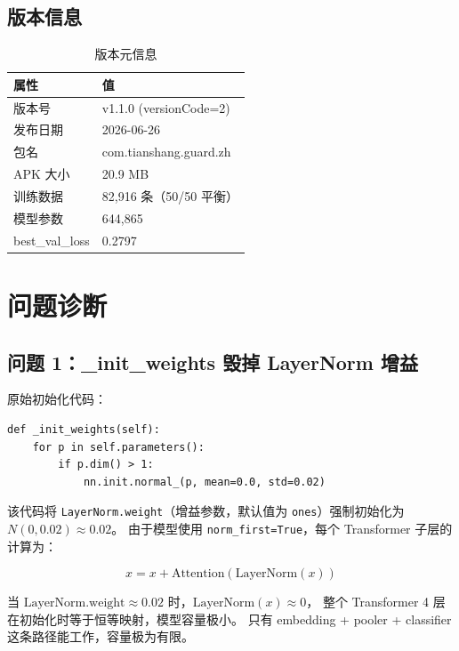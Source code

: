 \documentclass[11pt,a4paper]{article}
\begin{document}
\subsection{版本信息}

\begin{table}[H]
\centering
\caption{版本元信息}
\begin{tabular}{ll}
\toprule
属性 & 值 \\
\midrule
版本号 & v1.1.0 (versionCode=2) \\
发布日期 & 2026-06-26 \\
包名 & com.tianshang.guard.zh \\
APK 大小 & 20.9 MB \\
训练数据 & 82,916 条（50/50 平衡） \\
模型参数 & 644,865 \\
best\_val\_loss & 0.2797 \\
\bottomrule
\end{tabular}
\end{table}

\section{问题诊断}

\subsection{问题 1：\_init\_weights 毁掉 LayerNorm 增益}

原始初始化代码：

\begin{Verbatim}[frame=single,fontsize=\small]
def _init_weights(self):
    for p in self.parameters():
        if p.dim() > 1:
            nn.init.normal_(p, mean=0.0, std=0.02)
\end{Verbatim}

该代码将 \texttt{LayerNorm.weight}（增益参数，默认值为 \texttt{ones}）强制初始化为 $N(0, 0.02) \approx 0.02$。
由于模型使用 \texttt{norm\_first=True}，每个 Transformer 子层的计算为：

\begin{equation}
x = x + \text{Attention}(\text{LayerNorm}(x))
\end{equation}

当 $\text{LayerNorm.weight} \approx 0.02$ 时，$\text{LayerNorm}(x) \approx 0$，
整个 Transformer 4 层在初始化时等于恒等映射，模型容量极小。
只有 embedding + pooler + classifier 这条路径能工作，容量极为有限。
\end{document}
